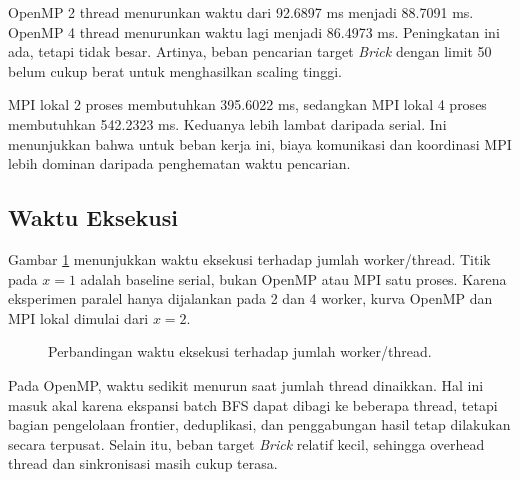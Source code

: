 \documentclass[conference]{IEEEtran}
\begin{document}
OpenMP 2 thread menurunkan waktu dari 92.6897 ms menjadi 88.7091 ms. OpenMP 4 thread menurunkan waktu lagi menjadi 86.4973 ms. Peningkatan ini ada, tetapi tidak besar. Artinya, beban pencarian target \textit{Brick} dengan limit 50 belum cukup berat untuk menghasilkan scaling tinggi.

MPI lokal 2 proses membutuhkan 395.6022 ms, sedangkan MPI lokal 4 proses membutuhkan 542.2323 ms. Keduanya lebih lambat daripada serial. Ini menunjukkan bahwa untuk beban kerja ini, biaya komunikasi dan koordinasi MPI lebih dominan daripada penghematan waktu pencarian.

\subsection{Waktu Eksekusi}

Gambar \ref{fig:timeplot} menunjukkan waktu eksekusi terhadap jumlah worker/thread. Titik pada \(x=1\) adalah baseline serial, bukan OpenMP atau MPI satu proses. Karena eksperimen paralel hanya dijalankan pada 2 dan 4 worker, kurva OpenMP dan MPI lokal dimulai dari \(x=2\).

\begin{figure}[!t]
\centering
{}
\caption{Perbandingan waktu eksekusi terhadap jumlah worker/thread.}
\label{fig:timeplot}
\end{figure}

Pada OpenMP, waktu sedikit menurun saat jumlah thread dinaikkan. Hal ini masuk akal karena ekspansi batch BFS dapat dibagi ke beberapa thread, tetapi bagian pengelolaan frontier, deduplikasi, dan penggabungan hasil tetap dilakukan secara terpusat. Selain itu, beban target \textit{Brick} relatif kecil, sehingga overhead thread dan sinkronisasi masih cukup terasa.
\end{document}
